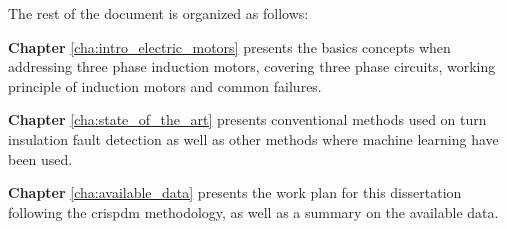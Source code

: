 The rest of the document is organized as follows:

\textbf{Chapter} \ref{cha:intro_electric_motors} presents the basics concepts when addressing three phase induction motors, covering three phase circuits, working principle of induction motors and common failures.

\textbf{Chapter} \ref{cha:state_of_the_art} presents conventional methods used on turn insulation fault detection as well as other methods where machine learning have been used.

\textbf{Chapter} \ref{cha:available_data} presents the work plan for this dissertation following the \acrshort{crispdm} methodology, as well as a summary on the available data.
